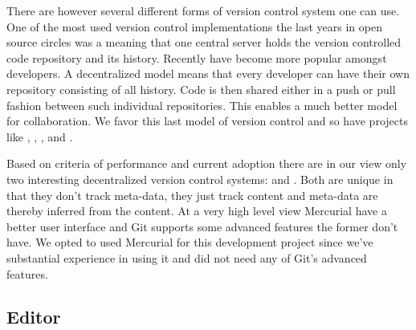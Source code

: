 There are however several different forms of version control system one can
use. One of the most used version control implementations the last years
in open source circles was
%
\dash{}a  meaning that one central
server holds the version controlled code repository and its history.%
Recently  have become more popular
amongst developers. A decentralized model means that every developer can have
their own repository consisting of all history.%
Code is then shared either in a push or pull fashion between such individual
repositories. This enables a much better model for collaboration.
We favor this last model of version control and so have projects
like , , ,
and .%

Based on criteria of performance and current adoption there are in our view
only two interesting decentralized version control systems:
%
and %
. Both are unique in that they don't track meta-data, they just track
content and meta-data are thereby inferred from the content.
At a very high level view Mercurial have a better user interface and Git
supports some advanced features the former don't have. We opted to used
Mercurial for this development project since we've substantial experience in
using it and did not need any of Git's advanced features.

\subsection{Editor}

